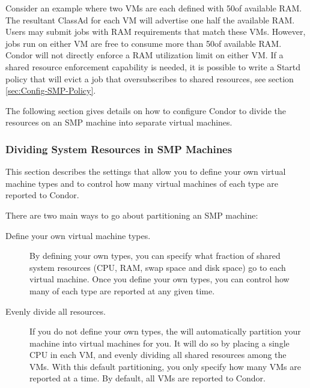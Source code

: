 Consider an example where two VMs are each defined with 50\Percent of
available RAM.  The resultant ClassAd for each VM will advertise one
half the available RAM.  Users may submit jobs with RAM requirements
that match these VMs.  However, jobs run on either VM are free to
consume more than 50\Percent of available RAM.  Condor will not
directly enforce a RAM utilization limit on either VM.  If a shared
resource enforcement capability is needed, it is possible to write a
Startd policy that will evict a job that oversubscribes to shared
resources, see section \ref{sec:Config-SMP-Policy}.

The following section gives details on how to configure Condor to
divide the resources on an SMP machine into separate virtual machines.

\subsubsection{\label{sec:SMP-Divide}
Dividing System Resources in SMP Machines}

This section describes the settings that allow you to define your own
virtual machine types and to control how many virtual machines of each
type are reported to Condor.

There are two main ways to go about partitioning an SMP machine:

\begin{description}

\item[Define your own virtual machine types.]
  By defining your own types, you can specify what fraction of shared
  system resources (CPU, RAM, swap space and disk space) go to each
  virtual machine.
  Once you define your own types, you can control how many of each
  type are reported at any given time.

\item[Evenly divide all resources.]  
  If you do not define your own types, the  will
  automatically	partition your machine into virtual machines for you.
  It will do so by placing a single CPU in each VM, and evenly dividing
  all shared resources among the VMs.
  With this default partitioning, you only specify how many
  VMs are reported at a time.
  By default, all VMs are reported to Condor.

\end{description}

